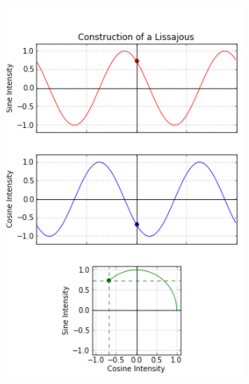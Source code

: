 \documentclass[11pt]{article}
\numberwithin{equation}{section}
\begin{document}
\begin{figure}[H]
  \centering
  \begin{minipage}[b]{0.49\textwidth}
    \includegraphics[width=\textwidth]{./img/Lissajous1.png}
  \end{minipage}
  \hfill
  \begin{minipage}[b]{0.49\textwidth}

\end{minipage}
\end{figure}
\end{document}

